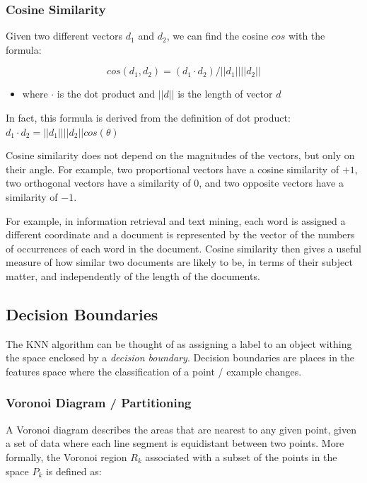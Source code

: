 \documentclass{article}
\begin{document}
\subsubsection{Cosine Similarity}\label{cosine-similarity}

Given two different vectors \(d_1\) and \(d_2\), we can find the cosine
\(cos\) with the formula:

\[cos(d_1, d_2) = (d_1 \cdot d_2) / ||d_1|| ||d_2||\]

\begin{itemize}
\tightlist
\item
  where \(\cdot\) is the dot product and \(||d||\) is the length of
  vector \(d\)
\end{itemize}

In fact, this formula is derived from the definition of dot product:
\(d_1 \cdot d_2 = ||d_1||||d_2||cos(\theta)\)

Cosine similarity does not depend on the magnitudes of the vectors, but
only on their angle. For example, two proportional vectors have a cosine
similarity of \(+1\), two orthogonal vectors have a similarity of \(0\),
and two opposite vectors have a similarity of \(-1\).

For example, in information retrieval and text mining, each word is
assigned a different coordinate and a document is represented by the
vector of the numbers of occurrences of each word in the document.
Cosine similarity then gives a useful measure of how similar two
documents are likely to be, in terms of their subject matter, and
independently of the length of the documents.

\subsection{Decision Boundaries}\label{decision-boundaries}

The KNN algorithm can be thought of as assigning a label to an object
withing the space enclosed by a \emph{decision boundary}. Decision
boundaries are places in the features space where the classification of
a point / example changes.

\subsubsection{Voronoi Diagram /
Partitioning}\label{voronoi-diagram-partitioning}

A Voronoi diagram describes the areas that are nearest to any given
point, given a set of data where each line segment is equidistant
between two points. More formally, the Voronoi region \(R_k\) associated
with a subset of the points in the space \(P_k\) is defined as:
\end{document}
